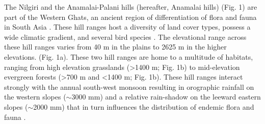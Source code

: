 The Nilgiri and the Anamalai-Palani hills (hereafter, Anamalai hills) (Fig. 1) are part of the Western Ghats, an ancient region of differentiation of flora and fauna in South Asia \citep{mani1974,myers2000,vijayakumar2016}.
These hill ranges host a diversity of land cover types, possess a wide climatic gradient, and several bird species \citep{ali1983a,das2006}.
The elevational range across these hill ranges varies from 40 m in the plains to 2625 m in the higher elevations.
(Fig. 1a).
These two hill ranges are home to a multitude of habitats, ranging from high elevation grasslands (>1400 m; Fig. 1b) to mid-elevation evergreen forests (>700 m and <1400 m; Fig. 1b).
These hill ranges interact strongly with the annual south-west monsoon resulting in orographic rainfall on the western slopes ($\sim$3000 mm) and a relative rain-shadow on the leeward eastern slopes ($\sim$2000 mm) that in turn influences the distribution of endemic flora and fauna \citep{gadgil1986,pascal1988,robin2015}.

